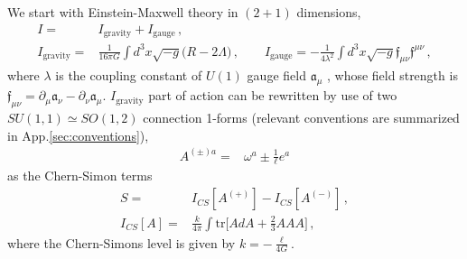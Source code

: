 \documentclass[11pt]{article}
\newcommand{\tr}{\mbox{tr}}
\numberwithin{equation}{section}
\begin{document}
We start with Einstein-Maxwell theory in $(2+1)$ dimensions,
\begin{align}
  I=& I_\text{gravity} + I_\text{gauge}  \,,\\
I_\text{gravity} =& \frac{1}{16 \pi G} \int d^3 x \sqrt{-g} \big( R-2\Lambda  \big) \,,\qquad
I_\text{gauge} = -\frac{1}{4 \lambda^2} \int d^3 x \sqrt{-g} \mathfrak{f}_{\mu\nu} \mathfrak{f}^{\mu\nu}
 \,,
\label{eq:EM_theory1}
\end{align}
where $\lambda$ is the coupling constant of $U(1)$ gauge field $\mathfrak{a}_\mu$
, whose field strength is $\mathfrak{f}_{\mu\nu}= \partial_\mu \mathfrak{a}_\nu - \partial_\nu \mathfrak{a}_\mu$.
$I_\text{gravity}$ part of action can be rewritten by use of two $SU(1,1)\simeq SO(1,2)$ connection 1-forms (relevant conventions are summarized in  App.\ref{sec:conventions}),
\begin{align}
  A^{(\pm)a} = & \omega^a \pm \frac{1}{\ell} e^a 
\label{eq:gauge_vb_sc}
\end{align}
as the Chern-Simon terms
\begin{align}
  S=& I_{CS}[A^{(+)}] - I_{CS}[A^{(-)}] \,,\\
  I_{CS}[A] =& \frac{k}{4\pi} \int \tr \bigg[
A d A + \frac{2}{3} AAA \bigg]  \,,
\label{eq:CS_action}
\end{align}
where
the Chern-Simons level is given by $k= -\frac{\ell}{4G}$.
\end{document}

